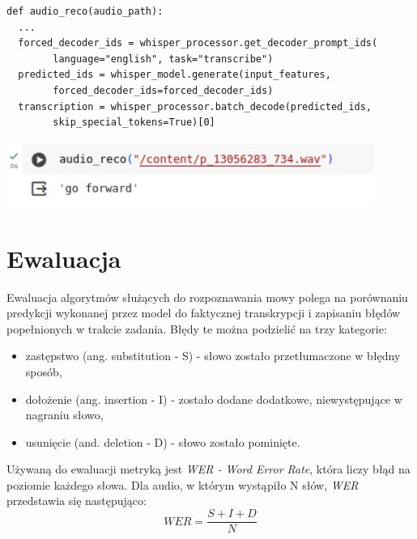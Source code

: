 \begin{lstlisting}
def audio_reco(audio_path):
  ...
  forced_decoder_ids = whisper_processor.get_decoder_prompt_ids(
        language="english", task="transcribe")
  predicted_ids = whisper_model.generate(input_features, 
        forced_decoder_ids=forced_decoder_ids)
  transcription = whisper_processor.batch_decode(predicted_ids, 
        skip_special_tokens=True)[0]
\end{lstlisting}

\begin{center}
    \includegraphics[width=12cm]{files/wav2vectest.png}
    \label{fig:whisper}
\end{center}


\section{Ewaluacja}
\label{sec:ewaluacja}

Ewaluacja algorytmów służących do rozpoznawania mowy polega na porównaniu predykcji wykonanej przez model do faktycznej transkrypcji i zapisaniu błędów popełnionych w trakcie zadania. Błędy te można podzielić na trzy kategorie:
\begin{itemize}
    \item zastępstwo (ang. substitution - S) - słowo zostało przetłumaczone w błędny sposób,
    \item dołożenie (ang. insertion - I) - zostało dodane dodatkowe, niewystępujące w nagraniu słowo,
    \item usunięcie (and. deletion - D) - słowo zostało pominięte.
\end{itemize}
Używaną do ewaluacji metryką jest \textit{WER - Word Error Rate}, która liczy błąd na poziomie każdego słowa. Dla audio, w którym wystąpiło N słów, \textit{WER} przedstawia się następująco:
\begin{equation}
    WER = \frac{S+I+D}{N}
\end{equation}

